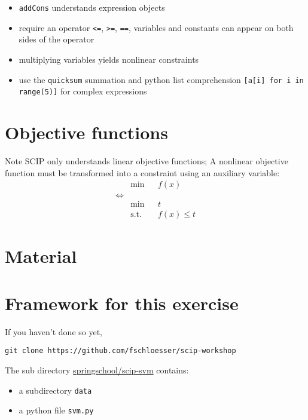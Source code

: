 \documentclass[10pt]{beamer}
\begin{document}
\begin{itemize}
\item \texttt{addCons} understands expression objects
\item require an operator \texttt{<=}, \texttt{>=}, \texttt{==}, variables and constants can appear on both sides of the operator
\item multiplying variables yields nonlinear constraints
\item use the \texttt{quicksum} summation and python list comprehension \texttt{[a[i] for i in range(5)]} for complex expressions
\end{itemize}

\section{Objective functions}
\begin{block}{Note}
  SCIP only understands linear objective functions; A nonlinear objective function must be transformed into a constraint using an auxiliary variable:
    \begin{equation*}
      \begin{aligned}
        & \min
        & & f(x) \\
        \Leftrightarrow \\
        & \min
        & & t \\
        & \text{s.t.}
        & &f(x) \leq t
      \end{aligned}
    \end{equation*}

\end{block}

\section{Material}

\section[fragile, label=fw]{Framework for this exercise}

  If you haven't done so yet,
  \begin{center}
    \texttt{git clone https://github.com/fschloesser/scip-workshop}
  \end{center}

  The sub directory \url{springschool/scip-svm} contains:
  \begin{itemize}
    \item a subdirectory \texttt{data}
    \item a python file \texttt{svm.py}
  \end{itemize}
\end{document}
